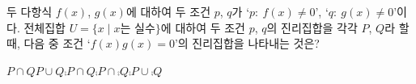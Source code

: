 두 다항식 $f(x)$, $g(x)$에 대하여 두 조건 $p$, $q$가 `$p:\ f(x)\ne 0$', `$q:\ g(x)\ne 0$'이다. 전체집합 $U=\{x \mid x$는 실수$\}$에 대하여 두 조건 $p$, $q$의 진리집합을 각각 $P$, $Q$라 할 때, 다음 중 조건 `$f(x)g(x)=0$'의 진리집합을 나타내는 것은?
\begin{choices32}{$P\cap Q$}{$P\cup Q$}{$\comp{P}\cap Q$}{$\comp{P}\cap\comp{Q}$}{$\comp{P}\cup\comp{Q}$}\end{choices32}
